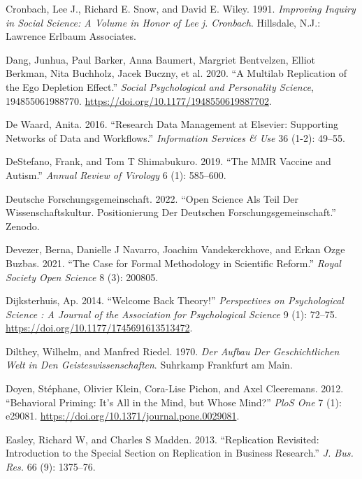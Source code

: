 \documentclass[
  letterpaper,
  DIV=11,
  numbers=noendperiod]{scrreprt}
\newlength{\cslhangindent}
\newenvironment{CSLReferences}[2] %
 {\begin{list}{}{%
  \setlength{\itemindent}{0pt}
  \setlength{\leftmargin}{0pt}
  \setlength{\parsep}{0pt}
  \ifodd #1
   \setlength{\leftmargin}{\cslhangindent}
   \setlength{\itemindent}{-1\cslhangindent}
  \fi
  \setlength{\itemsep}{#2\baselineskip}}}
 {\end{list}}
\begin{document}
\begin{CSLReferences}{1}{0}
Cronbach, Lee J., Richard E. Snow, and David E. Wiley. 1991.
\emph{Improving Inquiry in Social Science: A Volume in Honor of Lee j.
Cronbach}. Hillsdale, N.J.: {Lawrence Erlbaum Associates}.

Dang, Junhua, Paul Barker, Anna Baumert, Margriet Bentvelzen, Elliot
Berkman, Nita Buchholz, Jacek Buczny, et al. 2020. {``A Multilab
Replication of the Ego Depletion Effect.''} \emph{Social Psychological
and Personality Science}, 194855061988770.
\url{https://doi.org/10.1177/1948550619887702}.

De Waard, Anita. 2016. {``Research Data Management at Elsevier:
Supporting Networks of Data and Workflows.''} \emph{Information Services
\& Use} 36 (1-2): 49--55.

DeStefano, Frank, and Tom T Shimabukuro. 2019. {``The MMR Vaccine and
Autism.''} \emph{Annual Review of Virology} 6 (1): 585--600.

Deutsche Forschungsgemeinschaft. 2022. {``Open Science Als Teil Der
Wissenschaftskultur. Positionierung Der Deutschen
Forschungsgemeinschaft.''} Zenodo.

Devezer, Berna, Danielle J Navarro, Joachim Vandekerckhove, and Erkan
Ozge Buzbas. 2021. {``The Case for Formal Methodology in Scientific
Reform.''} \emph{Royal Society Open Science} 8 (3): 200805.

Dijksterhuis, Ap. 2014. {``Welcome Back Theory!''} \emph{Perspectives on
Psychological Science : A Journal of the Association for Psychological
Science} 9 (1): 72--75. \url{https://doi.org/10.1177/1745691613513472}.

Dilthey, Wilhelm, and Manfred Riedel. 1970. \emph{Der Aufbau Der
Geschichtlichen Welt in Den Geisteswissenschaften}. Suhrkamp Frankfurt
am Main.

Doyen, Stéphane, Olivier Klein, Cora-Lise Pichon, and Axel Cleeremans.
2012. {``Behavioral Priming: It's All in the Mind, but Whose Mind?''}
\emph{PloS One} 7 (1): e29081.
\url{https://doi.org/10.1371/journal.pone.0029081}.

Easley, Richard W, and Charles S Madden. 2013. {``Replication Revisited:
Introduction to the Special Section on Replication in Business
Research.''} \emph{J. Bus. Res.} 66 (9): 1375--76.


\end{CSLReferences}
\end{document}
